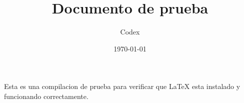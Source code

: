 \documentclass[12pt]{article}
\title{Documento de prueba}
\author{Codex}
\date{\today}
\begin{document}
\maketitle

Esta es una compilacion de prueba para verificar que LaTeX esta instalado y funcionando correctamente.


% 
\end{document}
